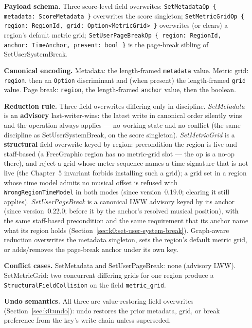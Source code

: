 \documentclass[11pt,letterpaper]{report}
\newcounter{requirement}[chapter]
\begin{document}
\textbf{Payload schema.} Three score-level field overwrites:
\texttt{SetMetadataOp \{ metadata: ScoreMetadata \}} overwrites the score
singleton; \texttt{SetMetricGridOp \{ region: RegionId, grid: Option<MetricGrid>
\}} overwrites (or clears) a region's default metric grid;
\texttt{SetUserPageBreakOp \{ region: RegionId, anchor: TimeAnchor, present: bool
\}} is the page-break sibling of SetUserSystemBreak.

\textbf{Canonical encoding.} Metadata: the length-framed \texttt{metadata} value.
Metric grid: \texttt{region}, then an \texttt{Option} discriminant and (when
present) the length-framed \texttt{grid} value. Page break: \texttt{region}, the
length-framed \texttt{anchor} value, then the boolean.

\textbf{Reduction rule.} Three field overwrites differing only in discipline.
\emph{SetMetadata} is an \textbf{advisory} last-writer-wins: the latest write in
canonical order silently wins and the operation always applies --- no working
state and no conflict (the same discipline as SetUserSystemBreak, on the score
singleton). \emph{SetMetricGrid} is a \textbf{structural} field overwrite keyed
by region: precondition the region is live and staff-based (a FreeGraphic region
has no metric-grid slot --- the op is a no-op there), and reject a grid whose
meter sequence names a time signature that is not live (the Chapter~5 invariant
forbids installing such a grid); a grid set in a region whose time model admits
no musical offset is refused with \texttt{WrongRegionTimeModel} in both modes
(since version~0.19.0; clearing it still applies). \emph{SetUserPageBreak} is a canonical LWW
advisory keyed by its anchor (since version~0.22.0; before it by the anchor's
resolved musical position), with the same staff-based precondition and the
same requirement that its anchor name what its region holds
(Section~\ref{sec:k0:set-user-system-break}). Graph-aware reduction overwrites
the metadata singleton, sets the region's default metric grid, or adds/removes
the page-break anchor under its own key.

\textbf{Conflict cases.} SetMetadata and SetUserPageBreak: none (advisory LWW).
SetMetricGrid: two concurrent differing grids for one region produce a
\texttt{StructuralFieldCollision} on the field \texttt{metric\_grid}.

\textbf{Undo semantics.} All three are value-restoring field overwrites
(Section~\ref{sec:k0:undo}): undo restores the prior metadata, grid, or break
preference from the key's write chain unless superseded.
\end{document}
